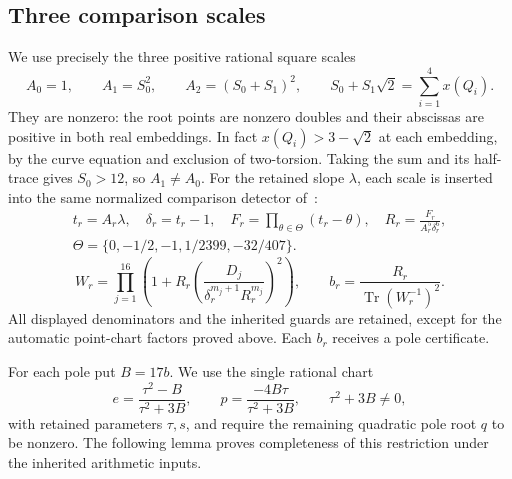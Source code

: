\documentclass[11pt,a4paper]{article}
\DeclareMathOperator{\Tr}{Tr}
\begin{document}
\subsection{Three comparison scales}

We use precisely the three positive rational
square scales
\begin{equation}\label{eq:scales}
 A_0=1,\qquad
 A_1=S_0^2,\qquad A_2=(S_0+S_1)^2,
 \qquad S_0+S_1\sqrt2=\sum_{i=1}^4x(Q_i).
\end{equation}
They are nonzero: the root points are nonzero doubles and
their abscissas are positive in both real embeddings.
In fact $x(Q_i)>3-\sqrt2$ at each embedding, by the curve
equation and exclusion of two-torsion. Taking the sum and its
half-trace gives $S_0>12$, so $A_1\ne A_0$.
For the retained slope $\lambda$, each scale is inserted into
the same normalized comparison detector of~\cite{Baseline}:
\[
 \begin{gathered}
 t_r=A_r\lambda,\quad \delta_r=t_r-1,\quad
 F_r=\prod_{\theta\in\Theta}(t_r-\theta),\quad
 R_r=\frac{F_r}{A_r^5\delta_r^6},\\
 \Theta=\{0,-1/2,-1,1/2399,-32/407\}.
 \end{gathered}
\]
\[
 W_r=\prod_{j=1}^{16}\left(
 1+R_r\left(\frac{D_j}{\delta_r^{m_j+1}R_r^{m_j}}\right)^2\right),
 \qquad b_r=\frac{R_r}{\Tr(W_r^{-1})^2}.
\]
All displayed denominators and the inherited guards are retained,
except for the automatic point-chart factors proved above.
Each $b_r$ receives a pole certificate.

For each pole put $B=17b$. We use the single rational chart
\[
 e=\frac{\tau^2-B}{\tau^2+3B},\qquad
 p=\frac{-4B\tau}{\tau^2+3B},\qquad
 \tau^2+3B\ne0,
\]
with retained parameters $\tau,s$, and require the remaining quadratic
pole root $q$ to be nonzero. The following lemma proves completeness
of this restriction under the inherited arithmetic inputs.
\end{document}
